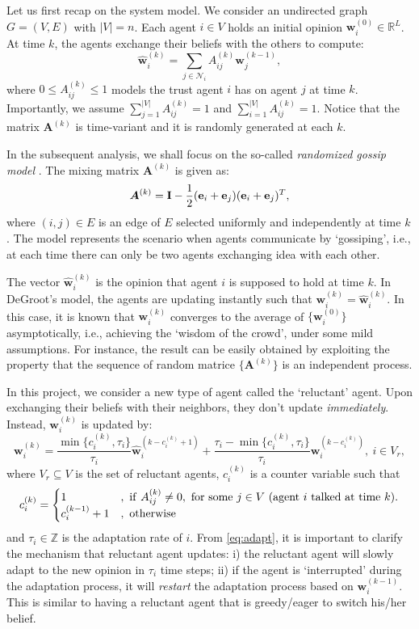 \documentclass[letter]{article}
\theoremstyle{remark}
\begin{document}
Let us first recap on the system model.
We consider an undirected graph $G = (V,E)$ with $|V| = n$. Each agent $i \in V$ holds an initial opinion ${\bm w}_i^{(0)} \in \mathbb{R}^L$. At time $k$, the agents exchange their beliefs with the others to compute:
\begin{equation}\label{eq:op}
\hat{\bm w}_i^{(k)} = \sum_{j \in \mathcal{N}_i} A_{ij}^{(k)} {\bm w}_j^{(k-1)},
\end{equation}
where $0 \leq A_{ij}^{(k)} \leq 1$ models the trust agent $i$ has on agent $j$ at time $k$. Importantly, we assume $\sum_{j=1}^{|V|} A_{ij}^{(k)} = 1$ and $\sum_{i=1}^{|V|} A_{ij}^{(k)} = 1$. Notice that the matrix ${\bm A}^{(k)}$ is time-variant and it is randomly generated at each $k$. 

In the subsequent analysis, we shall focus on the so-called \emph{randomized gossip model} \cite{}. The mixing matrix ${\bm A}^{(k)}$ is given as:
\[
{\bm A}^{(k)} = {\bf I} - \frac{1}{2} ({\bf e}_i + {\bf e}_j) ({\bf e}_i + {\bf e}_j)^T,
\]
where $(i,j) \in E$ is an edge of $E$ selected uniformly and independently at time $k$. The model represents the scenario when agents communicate by `gossiping', i.e., at each time there can only be two agents exchanging idea with each other. 


The vector $\hat{\bm w}_i^{(k)}$ is the opinion that agent $i$ is supposed to hold at time $k$. In DeGroot's model, the agents are updating instantly such that ${\bm w}_i^{(k)} = \hat{\bm w}_i^{(k)} $. In this case, it is known that ${\bm w}_i^{(k)}$ converges to the average of $\{{\bm w}_i^{(0)} \}$ asymptotically, i.e., achieving the `wisdom of the crowd',  under some mild assumptions. 
For instance, the result can be easily obtained by exploiting the property that the sequence of random matrice $\{ {\bm A}^{(k)} \}$ is an independent process. 

In this project, we consider a new type of agent called the `reluctant' agent. Upon exchanging their beliefs with their neighbors, they don't update \emph{immediately}. Instead, ${\bm w}_i^{(k)}$ is updated by:
\begin{equation} \label{eq:adapt}
{\bm w}_i^{(k)} = \frac{\min\{ c_i^{(k)}, \tau_i\} }{\tau_i} \hat{\bm w}_i^{(k - c_i^{(k)} + 1)} + \frac{\tau_i - \min\{ c_i^{(k)}, \tau_i\} }{\tau_i} {\bm w}_i^{(k-c_i^{(k)})},~i \in V_r,
\end{equation}
where $V_r \subseteq V$ is the set of reluctant agents, $c_i^{(k)}$ is a counter variable such that
\[
c_i^{(k)} = \begin{cases}
1 &,~{\rm if}~A_{ij}^{(k)} \neq 0,~\text{for some}~j \in V~\text{(agent $i$ talked at time $k$)}. \\
c_i^{(k-1)} + 1 &,~{\rm otherwise}
\end{cases}
\]
and $\tau_i \in \mathbb{Z}$ is the adaptation rate of $i$. From \eqref{eq:adapt}, it is important to clarify the mechanism that reluctant agent updates: i) the reluctant agent will slowly adapt to the new opinion in $\tau_i$ time steps; ii) if the agent is `interrupted' during the adaptation process, it will \emph{restart} the adaptation process based on ${\bm w}_i^{(k-1)}$. This is similar to having a reluctant agent that is greedy/eager to switch his/her belief.
\end{document}
